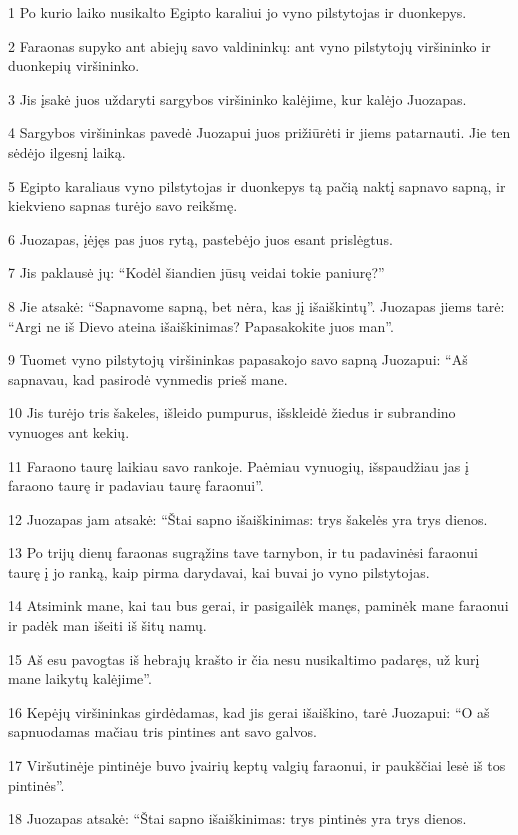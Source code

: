 \par 1 Po kurio laiko nusikalto Egipto karaliui jo vyno pilstytojas ir duonkepys. 
\par 2 Faraonas supyko ant abiejų savo valdininkų: ant vyno pilstytojų viršininko ir duonkepių viršininko. 
\par 3 Jis įsakė juos uždaryti sargybos viršininko kalėjime, kur kalėjo Juozapas. 
\par 4 Sargybos viršininkas pavedė Juozapui juos prižiūrėti ir jiems patarnauti. Jie ten sėdėjo ilgesnį laiką. 
\par 5 Egipto karaliaus vyno pilstytojas ir duonkepys tą pačią naktį sapnavo sapną, ir kiekvieno sapnas turėjo savo reikšmę. 
\par 6 Juozapas, įėjęs pas juos rytą, pastebėjo juos esant prislėgtus. 
\par 7 Jis paklausė jų: “Kodėl šiandien jūsų veidai tokie paniurę?” 
\par 8 Jie atsakė: “Sapnavome sapną, bet nėra, kas jį išaiškintų”. Juozapas jiems tarė: “Argi ne iš Dievo ateina išaiškinimas? Papasakokite juos man”. 
\par 9 Tuomet vyno pilstytojų viršininkas papasakojo savo sapną Juozapui: “Aš sapnavau, kad pasirodė vynmedis prieš mane. 
\par 10 Jis turėjo tris šakeles, išleido pumpurus, išskleidė žiedus ir subrandino vynuoges ant kekių. 
\par 11 Faraono taurę laikiau savo rankoje. Paėmiau vynuogių, išspaudžiau jas į faraono taurę ir padaviau taurę faraonui”. 
\par 12 Juozapas jam atsakė: “Štai sapno išaiškinimas: trys šakelės yra trys dienos. 
\par 13 Po trijų dienų faraonas sugrąžins tave tarnybon, ir tu padavinėsi faraonui taurę į jo ranką, kaip pirma darydavai, kai buvai jo vyno pilstytojas. 
\par 14 Atsimink mane, kai tau bus gerai, ir pasigailėk manęs, paminėk mane faraonui ir padėk man išeiti iš šitų namų. 
\par 15 Aš esu pavogtas iš hebrajų krašto ir čia nesu nusikaltimo padaręs, už kurį mane laikytų kalėjime”. 
\par 16 Kepėjų viršininkas girdėdamas, kad jis gerai išaiškino, tarė Juozapui: “O aš sapnuodamas mačiau tris pintines ant savo galvos. 
\par 17 Viršutinėje pintinėje buvo įvairių keptų valgių faraonui, ir paukščiai lesė iš tos pintinės”. 
\par 18 Juozapas atsakė: “Štai sapno išaiškinimas: trys pintinės yra trys dienos. 

